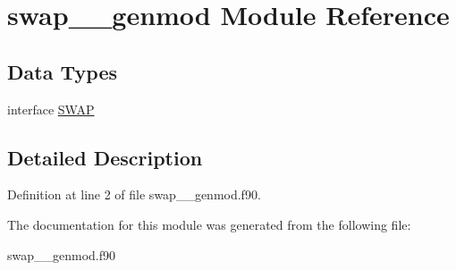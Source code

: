 \hypertarget{classswap____genmod}{\section{swap\+\_\+\+\_\+genmod Module Reference}
\label{classswap____genmod}
}
\subsection*{Data Types}
\begin{DoxyCompactItemize}
\item 
interface \hyperlink{interfaceswap____genmod_1_1_s_w_a_p}{S\+W\+A\+P}
\end{DoxyCompactItemize}


\subsection{Detailed Description}


Definition at line 2 of file swap\+\_\+\+\_\+genmod.\+f90.



The documentation for this module was generated from the following file\+:\begin{DoxyCompactItemize}
\item 
swap\+\_\+\+\_\+genmod.\+f90\end{DoxyCompactItemize}
